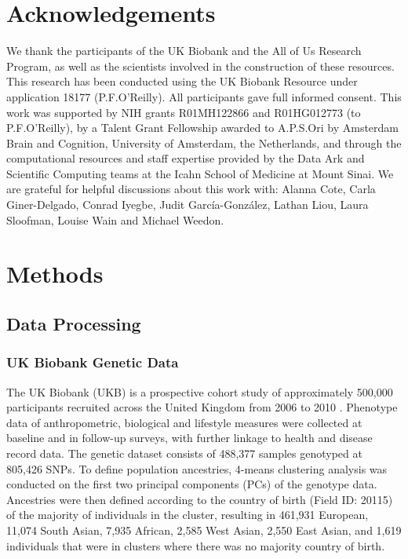 \documentclass[12pt]{zHenriquesLab-StyleBioRxiv}
\begin{document}
{{\section*{Acknowledgements}
We thank the participants of the UK Biobank and the All of Us Research Program, as well as the scientists involved in
the construction of these resources. This research has been conducted using
the UK Biobank Resource under application 18177 (P.F.O’Reilly). All participants gave full informed consent. This work was supported by NIH grants R01MH122866 and R01HG012773 (to P.F.O'Reilly), by a Talent Grant Fellowship awarded to A.P.S.Ori by Amsterdam Brain and Cognition, University of Amsterdam, the Netherlands, and through the computational resources and staff expertise provided by the Data Ark and Scientific Computing teams at the Icahn School of Medicine at Mount Sinai. We are grateful for helpful discussions about this work with: Alanna Cote, Carla Giner-Delgado, Conrad Iyegbe, Judit García-González, Lathan Liou, Laura Sloofman, Louise Wain and Michael Weedon.


\clearpage \newpage 
\section*{Methods} \label{sec:methods} 
\subsection*{Data Processing} \label{sec:methods:dataProcessing}
\subsubsection*{UK Biobank Genetic Data} 
The UK Biobank (UKB) is a prospective cohort study of approximately
500,000 participants recruited across the United Kingdom from 2006 to
2010 \cite{ukb}. Phenotype data of anthropometric, biological and
lifestyle measures were collected at baseline and in follow-up surveys, with
further linkage to health and disease record data. The genetic dataset
consists of 488,377 samples genotyped at 805,426 SNPs.
To define population ancestries, 4-means clustering analysis was
conducted on the first two principal components (PCs) of the genotype
data. Ancestries were then defined according to the country of 
birth (Field ID: 20115) of the majority of individuals in the cluster, resulting in 
461,931 European, 11,074 South Asian, 7,935 African, 2,585 West Asian, 
2,550 East Asian, and 1,619 individuals that were in clusters where there was 
no majority country of birth.

}}
\end{document}
